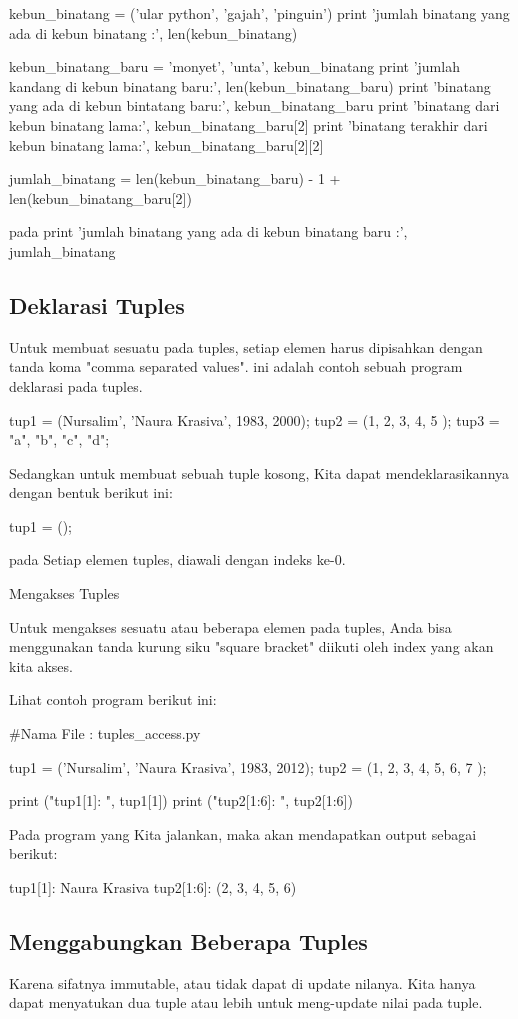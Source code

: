 kebun_binatang = ('ular python', 'gajah', 'pinguin')
print 'jumlah binatang yang ada di kebun binatang :', len(kebun_binatang)

kebun_binatang_baru = 'monyet', 'unta', kebun_binatang
print 'jumlah kandang di kebun binatang baru:', len(kebun_binatang_baru)
print 'binatang yang ada di kebun bintatang baru:', kebun_binatang_baru
print 'binatang dari kebun binatang lama:', kebun_binatang_baru[2]
print 'binatang terakhir dari kebun binatang lama:', kebun_binatang_baru[2][2]

jumlah_binatang = len(kebun_binatang_baru) - 1 + len(kebun_binatang_baru[2])

pada print 'jumlah binatang yang ada di kebun binatang baru :', jumlah_binatang
\subsection {Deklarasi Tuples}


Untuk membuat sesuatu pada tuples, setiap elemen harus dipisahkan dengan tanda koma "comma separated values". ini adalah contoh sebuah program deklarasi pada tuples.

tup1 = (Nursalim', 'Naura Krasiva', 1983, 2000);
tup2 = (1, 2, 3, 4, 5 );
tup3 = "a", "b", "c", "d";

Sedangkan untuk membuat sebuah tuple kosong, Kita dapat mendeklarasikannya dengan bentuk berikut ini:

tup1 = ();

pada Setiap elemen tuples, diawali dengan indeks ke-0.

Mengakses Tuples


Untuk mengakses sesuatu atau beberapa elemen pada tuples, Anda bisa menggunakan tanda kurung siku "square bracket" diikuti oleh index yang akan kita akses.

Lihat contoh program berikut ini:

#Nama File : tuples_access.py

tup1 = ('Nursalim', 'Naura Krasiva', 1983, 2012);
tup2 = (1, 2, 3, 4, 5, 6, 7 );

print ("tup1[1]: ", tup1[1])
print ("tup2[1:6]: ", tup2[1:6])

Pada program yang Kita jalankan, maka akan mendapatkan output sebagai berikut:

tup1[1]:  Naura Krasiva
tup2[1:6]:  (2, 3, 4, 5, 6)


\subsection {Menggabungkan Beberapa Tuples}
Karena sifatnya immutable, atau tidak dapat di update nilanya. Kita hanya dapat menyatukan dua tuple atau lebih untuk meng-update nilai pada tuple.

